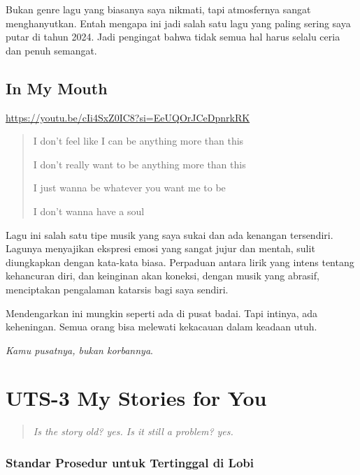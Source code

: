 \documentclass[
  letterpaper,
  DIV=11,
  numbers=noendperiod]{scrreprt}
\begin{document}
Bukan genre lagu yang biasanya saya nikmati, tapi atmosfernya sangat
menghanyutkan. Entah mengapa ini jadi salah satu lagu yang paling sering
saya putar di tahun 2024. Jadi pengingat bahwa tidak semua hal harus
selalu ceria dan penuh semangat.

\section{In My Mouth}\label{in-my-mouth}

\url{https://youtu.be/cIi4SxZ0IC8?si=EeUQOrJCeDpnrkRK}

\begin{quote}
I don't feel like I can be anything more than this

I don't really want to be anything more than this

I just wanna be whatever you want me to be

I don't wanna have a soul
\end{quote}

Lagu ini salah satu tipe musik yang saya sukai dan ada kenangan
tersendiri. Lagunya menyajikan ekspresi emosi yang sangat jujur dan
mentah, sulit diungkapkan dengan kata-kata biasa. Perpaduan antara lirik
yang intens tentang kehancuran diri, dan keinginan akan koneksi, dengan
musik yang abrasif, menciptakan pengalaman katarsis bagi saya sendiri.

Mendengarkan ini mungkin seperti ada di pusat badai. Tapi intinya, ada
keheningan. Semua orang bisa melewati kekacauan dalam keadaan utuh.

\emph{Kamu pusatnya, bukan korbannya}.


\chapter{UTS-3 My Stories for You}\label{uts-3-my-stories-for-you}

\begin{quote}
\emph{Is the story old? yes. Is it still a problem? yes.}
\end{quote}

\subsection{\texorpdfstring{\textbf{Standar Prosedur untuk Tertinggal di
Lobi}\\
}{Standar Prosedur untuk Tertinggal di Lobi }}\label{standar-prosedur-untuk-tertinggal-di-lobi}
\end{document}
